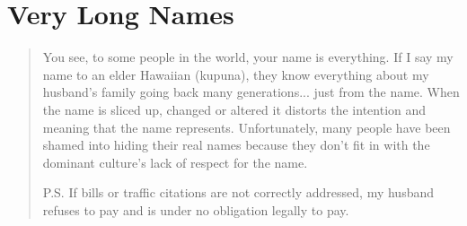 \section{Very Long Names}

\begin{quote}
You see, to some people in the world, your name is everything. If I say my name
to an elder Hawaiian (kupuna), they know everything about my husband's family
going back many generations... just from the name. When the name is sliced up,
changed or altered it distorts the intention and meaning that the name
represents. Unfortunately, many people have been shamed into hiding their real
names because they don't fit in with the dominant culture's lack of respect for
the name.

P.S. If bills or traffic citations are not correctly addressed, my husband
refuses to pay and is under no obligation legally to pay.
\end{quote}
